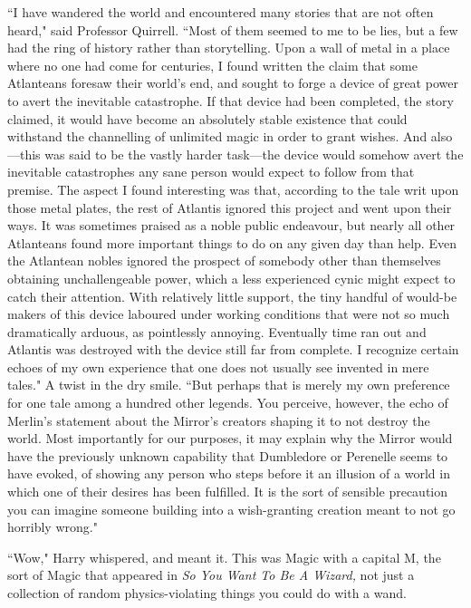 ``I have wandered the world and encountered many stories that are not often heard," said Professor Quirrell. ``Most of them seemed to me to be lies, but a few had the ring of history rather than storytelling. Upon a wall of metal in a place where no one had come for centuries, I found written the claim that some Atlanteans foresaw their world's end, and sought to forge a device of great power to avert the inevitable catastrophe. If that device had been completed, the story claimed, it would have become an absolutely stable existence that could withstand the channelling of unlimited magic in order to grant wishes. And also---this was said to be the vastly harder task---the device would somehow avert the inevitable catastrophes any sane person would expect to follow from that premise. The aspect I found interesting was that, according to the tale writ upon those metal plates, the rest of Atlantis ignored this project and went upon their ways. It was sometimes praised as a noble public endeavour, but nearly all other Atlanteans found more important things to do on any given day than help. Even the Atlantean nobles ignored the prospect of somebody other than themselves obtaining unchallengeable power, which a less experienced cynic might expect to catch their attention. With relatively little support, the tiny handful of would-be makers of this device laboured under working conditions that were not so much dramatically arduous, as pointlessly annoying. Eventually time ran out and Atlantis was destroyed with the device still far from complete. I recognize certain echoes of my own experience that one does not usually see invented in mere tales." A twist in the dry smile. ``But perhaps that is merely my own preference for one tale among a hundred other legends. You perceive, however, the echo of Merlin's statement about the Mirror's creators shaping it to not destroy the world. Most importantly for our purposes, it may explain why the Mirror would have the previously unknown capability that Dumbledore or Perenelle seems to have evoked, of showing any person who steps before it an illusion of a world in which one of their desires has been fulfilled. It is the sort of sensible precaution you can imagine someone building into a wish-granting creation meant to not go horribly wrong."

``Wow," Harry whispered, and meant it. This was Magic with a capital M, the sort of Magic that appeared in \emph{So You Want To Be A Wizard,} not just a collection of random physics-violating things you could do with a wand.

